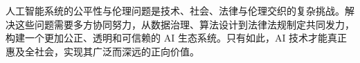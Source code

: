 
人工智能系统的公平性与伦理问题是技术、社会、法律与伦理交织的复杂挑战。解决这些问题需要多方协同努力，从数据治理、算法设计到法律法规制定共同发力，构建一个更加公正、透明和可信赖的 AI 生态系统。只有如此，AI 技术才能真正惠及全社会，实现其广泛而深远的正向价值。